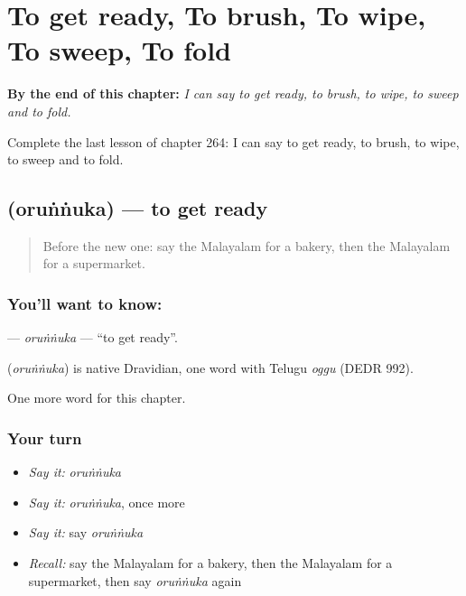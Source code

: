 
\chapter{To get ready, To brush, To wipe, To sweep, To fold}
\label{ch:ml-to-get-ready-to-brush-to-wipe-to-sweep-to-fold}

\begin{chapteropening}
\textbf{By the end of this chapter:} \emph{I can say to get ready, to brush, to wipe, to sweep and to fold.}

Complete the last lesson of chapter 264: I can say to get ready, to brush, to wipe, to sweep and to fold.
\end{chapteropening}

\section[\texorpdfstring{\ml{ഒരുങ്ങുക} (oruṅṅuka)}{ഒരുങ്ങുക (oruṅṅuka)}]{ (oruṅṅuka) — to get ready}

\label{lesson:ML-C264-orunnuka}



\begin{quote}
Before the new one: say the Malayalam for a bakery, then the Malayalam for a supermarket.
\end{quote}

\subsection*{You'll want to know: }
\textbf{} — \emph{oruṅṅuka} — \textquotedblleft{}to get ready\textquotedblright{}.

\begin{cousinweb}
\textbf{} (\emph{oruṅṅuka}) is native Dravidian, one word with Telugu \emph{oggu} (DEDR 992).
\end{cousinweb}

\begin{grammarlens}[title={What you've built}]
One more word for this chapter.
\end{grammarlens}

\subsection*{Your turn}
\begin{itemize}
\raggedright
  \item \emph{Say it:} \emph{oruṅṅuka}
  \item \emph{Say it:} \emph{oruṅṅuka}, once more
  \item \emph{Say it:} say \emph{oruṅṅuka}
  \item \emph{Recall:} say the Malayalam for a bakery, then the Malayalam for a supermarket, then say \emph{oruṅṅuka} again
\end{itemize}

